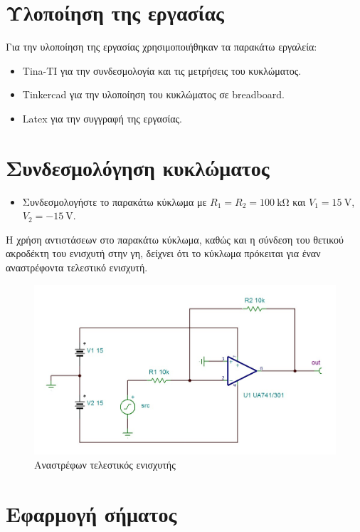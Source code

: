 \documentclass[12pt]{article}
\begin{document}
\section{Υλοποίηση της εργασίας}

Για την υλοποίηση της εργασίας χρησιμοποιήθηκαν τα παρακάτω εργαλεία:
\begin{itemize}
	\item Tina-TI για την συνδεσμολογία και τις μετρήσεις του κυκλώματος.
	\item Tinkercad για την υλοποίηση του κυκλώματος σε breadboard.
	\item Latex για την συγγραφή της εργασίας.
\end{itemize}

\section{Συνδεσμολόγηση κυκλώματος}

\begin{itemize}
	\item Συνδεσμολογήστε το παρακάτω κύκλωμα με
		$R_1 = R_2 = \SI{100}{\kilo\ohm}$ και
		$V_1 = \SI{15}{\volt}$,
		$V_2 = \SI{-15}{\volt}$.
\end{itemize}

Η χρήση αντιστάσεων στο παρακάτω κύκλωμα, καθώς και η σύνδεση του θετικού
ακροδέκτη του ενισχυτή στην γη, δείχνει ότι το κύκλωμα πρόκειται για έναν
αναστρέφοντα τελεστικό ενισχυτή.

\begin{figure}[H]
	\centering
	\includegraphics[width=\linewidth]{./res/schem.jpg}
	\caption{Αναστρέφων τελεστικός ενισχυτής}
\end{figure}

\section{Εφαρμογή σήματος}
\end{document}
